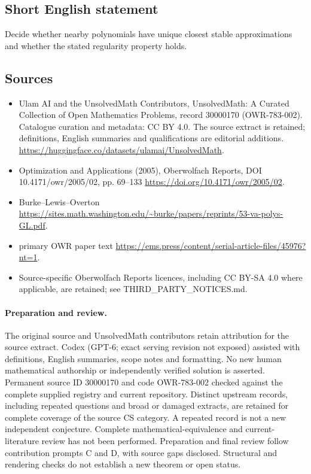 \documentclass[11pt]{article}
\begin{document}
\subsection{Short English statement}
Decide whether nearby polynomials have unique closest stable approximations and whether the stated regularity property holds.
\subsection{Sources}
\begin{itemize}
\item[\hypertarget{source:30000170:1}{S1}] Ulam AI and the UnsolvedMath Contributors, UnsolvedMath: A Curated Collection of Open Mathematics Problems, record 30000170 (OWR-783-002). Catalogue curation and metadata: CC BY 4.0. The source extract is retained; definitions, English summaries and qualifications are editorial additions.
\url{https://huggingface.co/datasets/ulamai/UnsolvedMath}.
\item[\hypertarget{source:30000170:2}{S2}] Optimization and Applications (2005), Oberwolfach Reports, DOI 10.4171/owr/2005/02, pp. 69--133
\url{https://doi.org/10.4171/owr/2005/02}.
\item[\hypertarget{source:30000170:3}{S3}] Burke--Lewis--Overton
\url{https://sites.math.washington.edu/~burke/papers/reprints/53-va-polys-GL.pdf}.
\item[\hypertarget{source:30000170:4}{S4}] primary OWR paper text
\url{https://ems.press/content/serial-article-files/45976?nt=1}.
\item Source-specific Oberwolfach Reports licences, including CC BY-SA 4.0 where applicable, are retained; see THIRD\_PARTY\_NOTICES.md.
\end{itemize}
\paragraph{Preparation and review.}
The original source and UnsolvedMath contributors retain attribution for the source extract. Codex (GPT-6; exact serving revision not exposed) assisted with definitions, English summaries, scope notes and formatting. No new human mathematical authorship or independently verified solution is asserted. Permanent source ID 30000170 and code OWR-783-002 checked against the complete supplied registry and current repository. Distinct upstream records, including repeated questions and broad or damaged extracts, are retained for complete coverage of the source CS category. A repeated record is not a new independent conjecture. Complete mathematical-equivalence and current-literature review has not been performed. Preparation and final review follow contribution prompts C and D, with source gaps disclosed. Structural and rendering checks do not establish a new theorem or open status.
\label{end:30000170}
\end{document}
